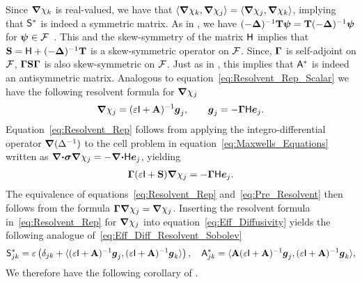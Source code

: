 \documentclass[amsa]{ipart}
\begin{document}
Since $\mbox{\boldmath${\nabla}$}\chi_k$ is real-valued, we have that
$\langle\mbox{\boldmath${\nabla}$}\chi_k,\mbox{\boldmath${\nabla}$}\chi_j\rangle=\langle\mbox{\boldmath${\nabla}$}\chi_j,\mbox{\boldmath${\nabla}$}\chi_k\rangle$, implying that
$\mathsf{S}^*$ is indeed a symmetric matrix. As in
, we have
$(-\mbox{\boldmath${\Delta}$})^{-1}\mathbf{T}\boldsymbol{\psi}=\mathbf{T}(-\mbox{\boldmath${\Delta}$})^{-1}\boldsymbol{\psi}$ for
$\boldsymbol{\psi}\in\mathcal{F}$~\cite{Folland:99:RealAnalysis,Stakgold:BVP:2000}. This
and the skew-symmetry of the matrix $\mathsf{H}$ implies that
$\mathbf{S}=\mathsf{H}+(-\mbox{\boldmath${\Delta}$})^{-1}\mathbf{T}$ is a skew-symmetric operator on
$\mathcal{F}$. Since, $\mbox{\boldmath${\Gamma}$}$ is self-adjoint on $\mathcal{F}$, $\mbox{\boldmath${\Gamma}$}\mathbf{S}\mbox{\boldmath${\Gamma}$}$
is also skew-symmetric on $\mathcal{F}$. Just as in
, this implies that $\mathsf{A}^*$ is indeed an
antisymmetric matrix. Analogous to
equation~\eqref{eq:Resolvent_Rep_Scalar} we have the following
resolvent formula for $\mbox{\boldmath${\nabla}$}\chi_j$
% 
\begin{align}\label{eq:Resolvent_Rep}
  \bnabla \chi_j=(\varepsilon\Ib+\Ab)^{-1}\vecg_j,
  \qquad
  \vecg_j=-\bGamma\Hm\vece_j.
\end{align}
%
Equation~\eqref{eq:Resolvent_Rep} follows from
applying the integro-differential operator $\mbox{\boldmath${\nabla}$} (\Delta^{-1})$ to the
cell problem in equation~\eqref{eq:Maxwells_Equations} written as 
$\mbox{\boldmath${\nabla}$}\mbox{\boldmath${\cdot}$}\mbox{\boldmath${\sigma}$}\mbox{\boldmath${\nabla}$}\chi_j=-\mbox{\boldmath${\nabla}$}\mbox{\boldmath${\cdot}$}\mathsf{H}\boldsymbol{e}_j$, yielding  
%
\begin{align}\label{eq:Pre_Resolvent}
  \bGamma(\varepsilon\Ib+\Sb)\bnabla \chi_j=-\bGamma\Hm\vece_j.
\end{align}
%
The equivalence of equations~\eqref{eq:Resolvent_Rep}
and~\eqref{eq:Pre_Resolvent} then follows from the formula
$\mbox{\boldmath${\Gamma}$}\mbox{\boldmath${\nabla}$}\chi_j=\mbox{\boldmath${\nabla}$}\chi_j$. Inserting the resolvent formula
in~\eqref{eq:Resolvent_Rep} for $\mbox{\boldmath${\nabla}$}\chi_j$ into
equation~\eqref{eq:Eff_Diffusivity} yields the following analogue
of~\eqref{eq:Eff_Diff_Resolvent_Sobolev} 
%
\begin{align}\label{eq:Eff_Diff_Resolvent}
 \Sm^*_{jk}=\varepsilon\left(\delta_{jk}+\langle(\varepsilon\Ib+\Ab)^{-1}\vecg_j,(\varepsilon\Ib+\Ab)^{-1}\vecg_k\rangle\right), \quad
 \Am^*_{jk}=\langle\Ab(\varepsilon\Ib+\Ab)^{-1}\vecg_j,(\varepsilon\Ib+\Ab)^{-1}\vecg_k\rangle,
\end{align}
%
We therefore have the following corollary of .
%
\end{document}
